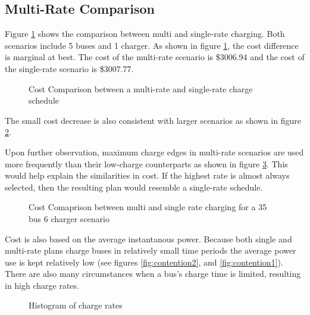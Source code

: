 \subsection{Multi-Rate Comparison}
Figure \ref{fig:multiRateCostComparison} shows the comparison between multi and single-rate charging. Both scenarios include 5 buses and 1 charger. As shown in figure \ref{fig:multiRateCostComparison}, the cost difference is marginal at best.  The cost of the multi-rate scenario is \$3006.94 and the cost of the single-rate scenario is \$3007.77. 
\begin{figure}
	\centering
	\caption{Cost Comparison between a multi-rate and single-rate charge schedule}
	\label{fig:multiRateCostComparison}
\end{figure}
The small cost decrease is also consistent with larger scenarios as shown in figure \ref{fig:costComparisonMultiVsSingleLarge}. 
\par Upon further observation, maximum charge edges in multi-rate scenarios are used more frequently than their low-charge counterparts as shown in figure \ref{fig:chargeRateHistogram}. This would help explain the similarities in cost. If the highest rate is almost always selected, then the resulting plan would resemble a single-rate schedule.  
\begin{figure}
	\caption{Cost Comaprison between multi and single rate charging for a 35 bus 6 charger scenario}
	\label{fig:costComparisonMultiVsSingleLarge}
\end{figure}
\par Cost is also based on the average instantanous power. Because both single and multi-rate plans charge buses in relatively small time periods the average power use is kept relatively low (see figures \ref{fig:contention2}, and \ref{fig:contention1}). There are also many circumstances when a bus's charge time is limited, resulting in high charge rates.
\begin{figure}
	\caption{Histogram of charge rates}
	\label{fig:chargeRateHistogram}
\end{figure}













